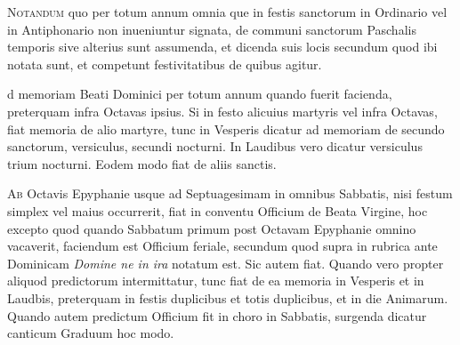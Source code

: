 \begin{multicols*}{2}
{\color{Red} }
\lettrine[lines=2]{\zallmancaps \color{Blue} N}{otandum} quo per totum annum omnia que in festis sanctorum in Ordinario vel in Antiphonario non inueniuntur signata, de communi sanctorum Paschalis temporis sive alterius sunt assumenda, et dicenda suis locis secundum quod ibi notata sunt, et competunt festivitatibus de quibus agitur.



\par {}d memoriam Beati Dominici per totum annum quando fuerit facienda, preterquam infra Octavas ipsius.
Si in festo alicuius martyris vel infra Octavas, fiat memoria de alio martyre, tunc in Vesperis dicatur ad memoriam de secundo sanctorum, versiculus, secundi nocturni. In Laudibus vero dicatur versiculus trium nocturni. Eodem modo fiat de aliis sanctis.

\lettrine[lines=2]{\zallmancaps \color{Blue} A}{b} Octavis Epyphanie usque ad Septuagesimam in omnibus Sabbatis, nisi festum simplex vel maius occurrerit, fiat in conventu Officium de Beata Virgine, hoc excepto quod quando Sabbatum primum post Octavam Epyphanie omnino vacaverit, faciendum est Officium feriale, secundum quod supra in rubrica ante Dominicam \textit{Domine ne in ira} notatum est. Sic autem fiat.
Quando vero propter aliquod predictorum intermittatur, tunc fiat de ea memoria in Vesperis et in Laudbis, preterquam in festis duplicibus et totis duplicibus, et in die Animarum.
Quando autem predictum Officium fit in choro in Sabbatis, surgenda dicatur canticum Graduum hoc modo.


\end{multicols*}
